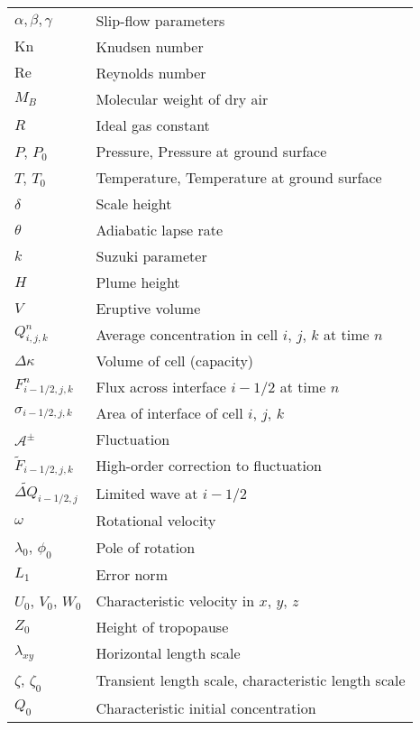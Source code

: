 \begin{table}
\begin{tabular}{ll}
$\alpha,\beta,\gamma$            & Slip-flow parameters \\
$\mathrm{Kn}$                    & Knudsen number \\
$\mathrm{Re}$                    & Reynolds number \\
$M_B$                            & Molecular weight of dry air \\
$R$                              & Ideal gas constant \\
$P$, $P_0$                       & Pressure, Pressure at ground surface \\
$T$, $T_0$                       & Temperature, Temperature at ground surface \\
$\delta$                         & Scale height \\
$\theta$                         & Adiabatic lapse rate \\
$k$                              & Suzuki parameter \\
$H$                              & Plume height \\
$V$                              & Eruptive volume \\
$Q^n_{i,j,k}$                    & Average concentration in cell $i$, $j$, $k$ at time $n$ \\
$\Delta \kappa$                  & Volume of cell (capacity) \\
$F^n_{i-1/2,j,k}$                & Flux across interface $i-1/2$ at time $n$\\
$\sigma_{i-1/2,j,k}$             & Area of interface  of cell $i$, $j$, $k$\\
$\mathcal{A}^{\pm}$              & Fluctuation \\
$\tilde{F}_{i-1/2,j,k}$          & High-order correction to fluctuation \\
$\widetilde{\Delta Q}_{i-1/2,j}$  & Limited wave at $i-1/2$\\
$\omega$                         & Rotational velocity \\
$\lambda_0$, $\phi_0$            & Pole of rotation \\
$L_1$                            & Error norm \\
$U_0$, $V_0$, $W_0$              & Characteristic velocity in $x$, $y$, $z$\\
$Z_0$                            & Height of tropopause  \\
$\lambda_{xy}$                   & Horizontal length scale \\
$\zeta$, $\zeta_0$               & Transient length scale, characteristic length scale \\
$Q_0$                            & Characteristic initial concentration \\
\hline
\end{tabular}
\end{table}

